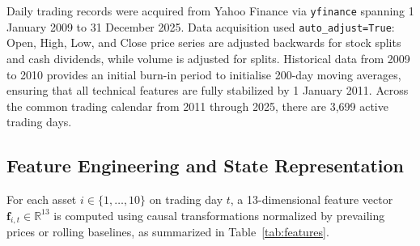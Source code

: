 \documentclass[11pt,a4paper]{article}
\numberwithin{equation}{section}
\numberwithin{table}{section}
\numberwithin{figure}{section}
\numberwithin{algorithm}{section}
\begin{document}
Daily trading records were acquired from Yahoo Finance via \texttt{yfinance} spanning 1 January 2009 to 31 December 2025. Data acquisition used \texttt{auto\_adjust=True}: Open, High, Low, and Close price series are adjusted backwards for stock splits and cash dividends, while volume is adjusted for splits. Historical data from 2009 to 2010 provides an initial burn-in period to initialise 200-day moving averages, ensuring that all technical features are fully stabilized by 1 January 2011. Across the common trading calendar from 2011 through 2025, there are 3,699 active trading days.

\subsection{Feature Engineering and State Representation}
For each asset $i\in\{1,\dots,10\}$ on trading day $t$, a 13-dimensional feature vector $\mathbf{f}_{i,t}\in\mathbb{R}^{13}$ is computed using causal transformations normalized by prevailing prices or rolling baselines, as summarized in Table~\ref{tab:features}.
\end{document}
